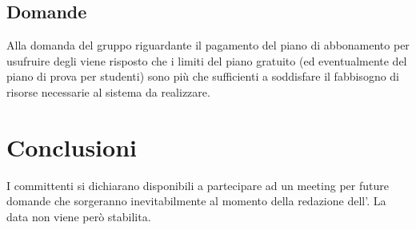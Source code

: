 \subsection{Domande}
Alla domanda del gruppo riguardante il pagamento del piano di abbonamento per usufruire degli  viene risposto che i limiti del piano gratuito (ed eventualmente del piano di prova per studenti) sono più che sufficienti a soddisfare il fabbisogno di risorse necessarie al sistema da realizzare.

\section{Conclusioni}
I committenti si dichiarano disponibili a partecipare ad un meeting per future domande che sorgeranno inevitabilmente al momento della redazione dell'. La data non viene però stabilita. 